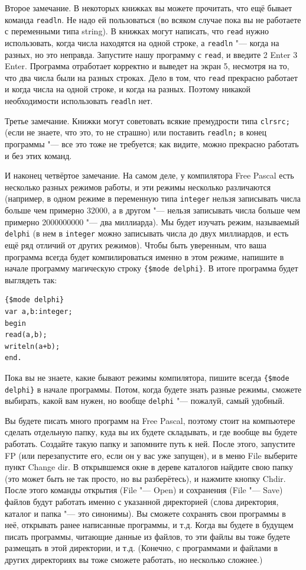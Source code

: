 Второе замечание. В некоторых книжках вы можете прочитать, что ещё бывает команда \verb`readln`. Не надо ей пользоваться (во всяком случае пока вы не работаете с переменными типа string). В книжках могут написать, что \verb`read` нужно использовать, когда числа находятся на одной строке, а \verb`readln` "--- когда на разных, но это неправда. Запустите нашу программу с \verb`read`, и введите 2 Enter 3 Enter. Программа отработает корректно и выведет на экран 5, несмотря на то, что два числа были на разных строках. Дело в том, что \verb`read` прекрасно работает и когда числа на одной строке, и когда на разных. Поэтому никакой необходимости использовать \verb`readln` нет.

Третье замечание. Книжки могут советовать всякие премудрости типа \verb`clrsrc;` (если не знаете, что это, то не страшно) или поставить \verb`readln;` в конец программы "--- все это тоже не требуется; как видите, можно прекрасно работать и без этих команд.

И наконец четвёртое замечание. На самом деле, у компилятора Free Pascal есть несколько разных 
режимов работы, и эти режимы несколько различаются (например, в одном режиме в переменную типа 
\verb`integer` нельзя записывать числа больше чем примерно 32000, а в другом "--- нельзя записывать 
числа больше чем примерно 2000000000 "--- два миллиарда). Мы будет изучать режим, называемый 
\verb`delphi` (в нем в \verb`integer` можно записывать числа до двух миллиардов, и есть ещё ряд 
отличий от других режимов). Чтобы быть уверенным, что ваша программа всегда будет компилироваться 
именно в этом режиме, напишите в начале программу магическую строку \verb`{$mode delphi}`. В итоге 
программа будет выглядеть так:
\begin{verbatim}
{$mode delphi}
var a,b:integer;
begin
read(a,b);
writeln(a+b);
end.
\end{verbatim}
Пока вы не знаете, какие бывают режимы компилятора, пишите всегда \verb`{$mode delphi}` в начале программы. Потом, когда будете знать разные режимы, сможете выбирать, какой вам нужен, но вообще \verb`delphi` "--- пожалуй, самый удобный.

Вы будете писать много программ на Free Pascal, поэтому стоит на компьютере сделать отдельную 
папку, куда вы их будете складывать, и где вообще вы будете работать. Создайте такую папку и 
запомните путь к ней. После этого, запустите FP (или перезапустите его, если он у вас уже запущен), 
и в меню File выберите пункт Change dir. В открывшемся окне в дереве каталогов найдите свою папку 
(это может быть не так просто, но вы разберётесь), и нажмите кнопку Chdir. После этого команды 
открытия (File "--- Open) и сохранения (File "--- Save) файлов будут работать именно с указанной 
директорией (слова директория, каталог и папка "--- это синонимы). Вы сможете сохранять свои 
программы в неё, открывать ранее написанные программы, и т.д. Когда вы будете в будущем писать 
программы, читающие данные из файлов, то эти файлы вы тоже будете размещать в этой директории, и 
т.д. (Конечно, с программами и файлами в других директориях вы тоже сможете работать, но несколько 
сложнее.)

